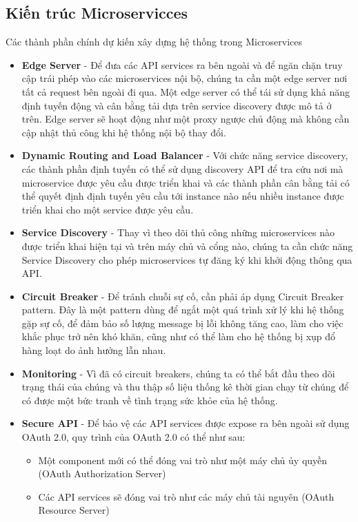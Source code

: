 		\subsection{Kiến trúc Microservicces}
		Các thành phần chính dự kiến xây dựng hệ thống trong Microservices
		\begin{itemize}
		    \item \textbf{Edge Server} - Để đưa các API services ra bên ngoài và để ngăn chặn truy cập trái phép vào các microservices nội bộ, chúng ta cần một edge server nơi tất cả request bên ngoài đi qua. Một edge server có thể tái sử dụng khả năng định tuyến động và cân bằng tải dựa trên service discovery được mô tả ở trên. Edge server sẽ hoạt động như một proxy ngược chủ động mà không cần cập nhật thủ công khi hệ thống nội bộ thay đổi.
		    \item \textbf{Dynamic Routing and Load Balancer} - Với chức năng service discovery, các thành phần định tuyến có thể sử dụng discovery API để tra cứu nơi mà microservice được yêu cầu được triển khai và các thành phần cân bằng tải có thể quyết định định tuyến yêu cầu tới instance nào nếu nhiều instance được triển khai cho một service được yêu cầu.
		    \item \textbf{Service Discovery} - Thay vì theo dõi thủ công những microservices nào được triển khai hiện tại và trên máy chủ và cổng nào, chúng ta cần chức năng Service Discovery cho phép microservices tự đăng ký khi khởi động thông qua API.
		    \item \textbf{Circuit Breaker} - Để tránh chuỗi sự cố, cần phải áp dụng Circuit Breaker pattern. Đây là một pattern dùng để ngắt một quá trình xử lý khi hệ thống gặp sự cố, để đảm bảo số lượng message bị lỗi không tăng cao, làm cho việc khắc phục trở nên khó khăn, cũng như có thể làm cho hệ thống bị xụp đổ hàng loạt do ảnh hưởng lẫn nhau.
		    \item \textbf{Monitoring} - Vì đã có circuit breakers, chúng ta có thể bắt đầu theo dõi trạng thái của chúng và thu thập số liệu thống kê thời gian chạy từ chúng để có được một bức tranh về tình trạng sức khỏe của hệ thống.
	        \item \textbf{Secure API} - Để bảo vệ các API services được expose ra bên ngoài sử dụng OAuth 2.0, quy trình của OAuth 2.0 có thể như sau:
	        \begin{itemize}
	            \item Một component mới có thể đóng vai trò như một máy chủ ủy quyền (OAuth Authorization Server)
	            \item Các API services sẽ đóng vai trò như các máy chủ tài nguyên (OAuth Resource Server)

\end{itemize}
\end{itemize}
